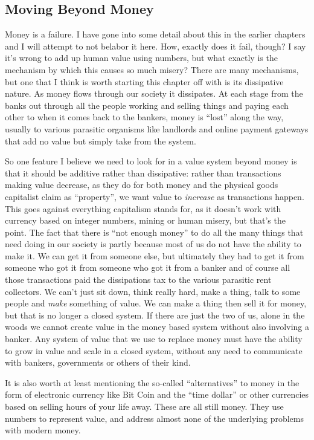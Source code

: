 \subsection{Moving Beyond Money}\label{moving-beyond-money}

Money is a failure. I have gone into some detail about this in the
earlier chapters and I will attempt to not belabor it here. How, exactly
does it fail, though? I say it's wrong to add up human value using
numbers, but what exactly is the mechanism by which this causes so much
misery? There are many mechanisms, but one that I think is worth
starting this chapter off with is its dissipative nature. As money flows
through our society it dissipates. At each stage from the banks out
through all the people working and selling things and paying each other
to when it comes back to the bankers, money is ``lost'' along the way,
usually to various parasitic organisms like landlords and online payment
gateways that add no value but simply take from the system.

So one feature I believe we need to look for in a value system beyond
money is that it should be additive rather than dissipative: rather than
transactions making value decrease, as they do for both money and the
physical goods capitalist claim as ``property'', we want value to
\emph{increase} as transactions happen. This goes against everything
capitalism stands for, as it doesn't work with currency based on integer
numbers, mining or human misery, but that's the point. The fact that
there is ``not enough money'' to do all the many things that need doing
in our society is partly because most of us do not have the ability to
make it. We can get it from someone else, but ultimately they had to get
it from someone who got it from someone who got it from a banker and of
course all those transactions paid the dissipations tax to the various
parasitic rent collectors. We can't just sit down, think really hard,
make a thing, talk to some people and \emph{make} something of value. We
can make a thing then sell it for money, but that is no longer a closed
system. If there are just the two of us, alone in the woods we cannot
create value in the money based system without also involving a banker.
Any system of value that we use to replace money must have the ability
to grow in value and scale in a closed system, without any need to
communicate with bankers, governments or others of their kind.

It is also worth at least mentioning the so-called ``alternatives'' to
money in the form of electronic currency like Bit Coin and the ``time
dollar'' or other currencies based on selling hours of your life away.
These are all still money. They use numbers to represent value, and
address almost none of the underlying problems with modern money.

